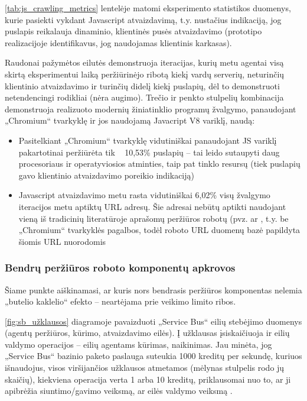 
\ref{tab:js_crawling_metrics} lentelėje matomi eksperimento statistikos duomenys, kurie pasiekti vykdant Javascript atvaizdavimą, t.y. nustačius indikaciją, jog puslapis reikalauja dinaminio, klientinės pusės atvaizdavimo (prototipo realizacijoje identifikavus, jog naudojamas klientinis karkasas).


Raudonai pažymėtos eilutės demonstruoja iteracijas, kurių metu agentai visą skirtą eksperimentui laiką peržiūrinėjo ribotą kiekį vardų serverių, neturinčių klientinio atvaizdavimo ir turinčių didelį kiekį puslapių, dėl to demonstruoti netendencingi rodikliai (nėra augimo). Trečio ir penkto stulpelių kombinacija demonstruoja realizuoto modernių žiniatinklio programų žvalgymo, panaudojant „Chromium“ tvarkyklę ir jos naudojamą Javacript V8 variklį, naudą:
\begin{itemize}
    \item Pasitelkiant „Chromium“ tvarkyklę vidutiniškai panaudojant JS variklį pakartotinai peržiūrėta tik ~ 10,53\% puslapių -- tai leido sutaupyti daug procesoriaus ir operatyviosios atminties, taip pat tinklo resursų (tiek puslapių gavo klientinio atvaizdavimo poreikio indikaciją)
    \item Javascript atvaizdavimo metu rasta vidutiniškai 6,02\% visų žvalgymo iteracijos metu aptiktų URL adresų. Šie adresai nebūtų aptikti naudojant vieną iš tradicinių literatūroje aprašomų peržiūros robotų (pvz. \cite{HeritrixArchitecture} ar \cite{Mercator}, t.y. be „Chromium“ tvarkyklės pagalbos, todėl roboto URL duomenų bazė papildyta šiomis URL nuorodomis
\end{itemize}
\subsubsection{Bendrų peržiūros roboto komponentų apkrovos}

Šiame punkte aiškinamasi, ar kuris nors bendrasis peržiūros komponentas nelemia „butelio kaklelio“ efekto -- neartėjama prie veikimo limito ribos.


\ref{fig:sb_užklausos} diagramoje pavaizduoti „Service Bus“ eilių stebėjimo duomenys (agentų peržiūros, kūrimo, atvaizdavimo eilės). Į užklausas įsiskaičiuoja ir eilių valdymo operacijos -- eilių agentams kūrimas, naikinimas. Jau minėta, jog „Service Bus“ bazinio paketo paslauga suteukia 1000 kreditų per sekundę, kuriuos išnaudojus, visos viršijančios užklausos atmetamos (mėlynas stulpelis rodo jų skaičių), kiekviena operacija verta 1 arba 10 kreditų, priklausomai nuo to, ar ji apibrėžia siuntimo/gavimo veiksmą, ar eilės valdymo veiksmą \cite{ServiceBusThrottlingOverview}. 


